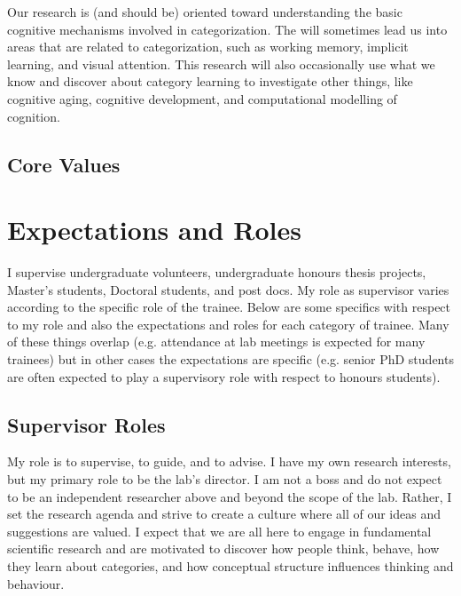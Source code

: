 \documentclass{article}
\begin{document}
Our research is (and should be) oriented toward understanding the basic cognitive mechanisms involved in categorization. The will sometimes lead us into areas that are related to categorization, such as working memory, implicit learning, and visual attention. This research will also occasionally use what we know and discover about category learning to investigate other things, like cognitive aging, cognitive development, and computational modelling of cognition.

\subsection{Core Values}




\section{Expectations and Roles} 
I supervise undergraduate volunteers, undergraduate honours thesis projects, Master's students, Doctoral students, and post docs. My role as supervisor varies according to the specific role of the trainee. Below are some specifics with respect to my role and also the expectations and roles for each category of trainee. Many of these things overlap (e.g. attendance at lab meetings is expected for many trainees) but in other cases the expectations are specific (e.g. senior PhD students are often expected to play a supervisory role with respect to honours students). 

\subsection{Supervisor Roles}
My role is to supervise, to guide, and to advise. I have my own research interests, but my primary role to be the lab's director. I am not a boss and do not expect to be an independent researcher above and beyond the scope of the lab. Rather, I set the research agenda and strive to create a culture where all of our ideas and suggestions are valued. I expect that we are all here to engage in fundamental scientific research and are motivated to discover how people think, behave, how they learn about categories, and how conceptual structure influences thinking and behaviour. 

\end{document}

